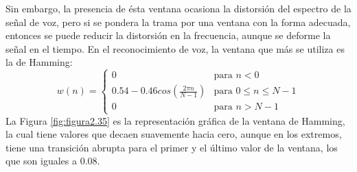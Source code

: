 \begin{enumerate}
Sin embargo, la presencia de ésta ventana ocasiona la distorsión del espectro de la señal de voz, pero si se pondera la trama por una ventana con la forma adecuada, entonces se puede reducir la distorsión en la frecuencia, aunque se deforme la señal en el tiempo. En el reconocimiento de voz, la ventana que más se utiliza es la de Hamming:
\begin{equation}
\label{eq:ecuacion36}
%
w(n) = 
\begin{cases}
0 & \text{para $n < 0$} \\ 
0.54 - 0.46cos(\frac{2\pi n}{N-1}) & \text{para $0 \leq  n \leq  N-1$} \\ 
0 & \text{para $n > N-1$} 
\end{cases}
%
\end{equation}
La Figura \ref{fig:figura2.35} es la representación gráfica de la ventana de Hamming, la cual tiene valores que decaen suavemente hacia cero, aunque en los extremos, tiene una transición abrupta para el primer y el último valor de la ventana, los que son iguales a 0.08.


\end{enumerate}

